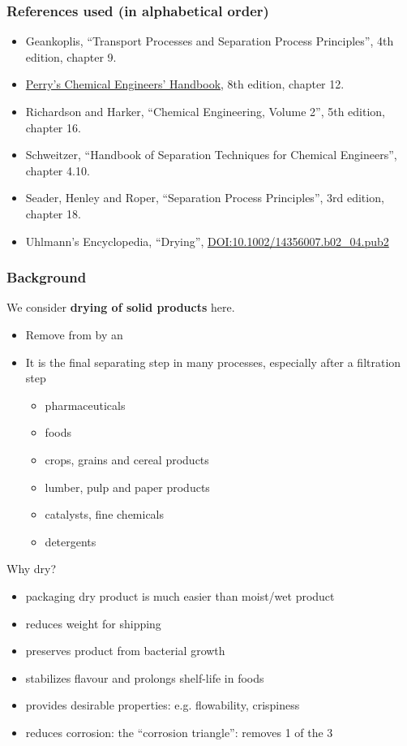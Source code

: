 \begin{frame}\frametitle{References used (in alphabetical order)}
	\begin{itemize}
		\item	Geankoplis, ``Transport Processes and Separation Process Principles'', 4th edition, chapter 9.
		\item	\href{http://accessengineeringlibrary.com/browse/perrys-chemical-engineers-handbook-eighth-edition}{Perry's Chemical Engineers' Handbook}, 8th edition, chapter 12.
		\item	Richardson and Harker, ``Chemical Engineering, Volume 2'', 5th edition, chapter 16.
		\item	Schweitzer, ``Handbook of Separation Techniques for Chemical Engineers'', chapter 4.10.
		\item	Seader, Henley and Roper, ``Separation Process Principles'', 3rd edition, chapter 18.
		\item	Uhlmann's Encyclopedia, ``Drying'', {\tiny \href{http://dx.doi.org/10.1002/14356007.b02\_04.pub2}{DOI:10.1002/14356007.b02\_04.pub2}}
	\end{itemize}
\end{frame}

\begin{frame}\frametitle{Background}
	We consider \textbf{drying of solid products} here.
	\begin{itemize}
		\item	Remove {\color{myOrange}{liquid phase}} from {\color{myOrange}{solid phase}} by an {\color{myOrange}{ESA = thermal energy}}
		\item	It is the final separating step in many processes, especially after a filtration step
		\begin{itemize}
			\item	pharmaceuticals %
			\item	foods %
			\item	crops, grains and cereal products %
			\item	lumber, pulp and paper products %
			\item	catalysts, fine chemicals  %
			\item	detergents
		\end{itemize}
	\end{itemize}
	Why dry?
	\begin{itemize}
		\item	packaging dry product is much easier than moist/wet product
		\item	reduces weight for shipping
		\item	preserves product from bacterial growth
		\item	stabilizes flavour and prolongs shelf-life in foods
		\item	provides desirable properties: e.g. flowability, crispiness
		\item	reduces corrosion: the ``corrosion triangle'': removes 1 of the 3
	\end{itemize}
\end{frame}

